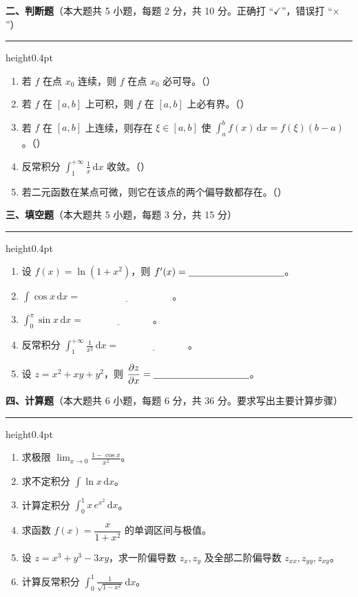 \documentclass[12pt]{ctexart}
\newcommand{\bigsection}[2]{%
  \vspace{6pt}%
  {\noindent\bfseries\large #1}\hfill{\normalsize（本大题共 #2）}\par
  \vspace{2pt}\hrule height0.4pt\vspace{8pt}}
\newcommand{\blank}[1][3cm]{\underline{\hspace{#1}}}
\begin{document}
\bigsection{二、判断题}{5 小题，每题 2 分，共 10 分。正确打 “$\checkmark$”，错误打 “$\times$”}

\begin{enumerate}[label=\arabic*.]
\item 若 $f$ 在点 $x_{0}$ 连续，则 $f$ 在点 $x_{0}$ 必可导。\hfill（\qquad）
\item 若 $f$ 在 $[a,b]$ 上可积，则 $f$ 在 $[a,b]$ 上必有界。\hfill（\qquad）
\item 若 $f$ 在 $[a,b]$ 上连续，则存在 $\xi\in[a,b]$ 使
  $\displaystyle\int_{a}^{b}f(x)\,\mathrm{d}x=f(\xi)(b-a)$。\hfill（\qquad）
\item 反常积分 $\displaystyle\int_{1}^{+\infty}\frac{1}{x}\,\mathrm{d}x$ 收敛。\hfill（\qquad）
\item 若二元函数在某点可微，则它在该点的两个偏导数都存在。\hfill（\qquad）
\end{enumerate}

\bigsection{三、填空题}{5 小题，每题 3 分，共 15 分}

\begin{enumerate}[label=\arabic*.]
\item 设 $f(x)=\ln(1+x^{2})$，则 $f'(x)=\blank[3.5cm]$。
\item $\displaystyle\int \cos x\,\mathrm{d}x=\blank[4cm]$。
\item $\displaystyle\int_{0}^{\pi}\sin x\,\mathrm{d}x=\blank[3cm]$。
\item 反常积分 $\displaystyle\int_{1}^{+\infty}\frac{1}{x^{2}}\,\mathrm{d}x=\blank[3cm]$。
\item 设 $z=x^{2}+xy+y^{2}$，则 $\dfrac{\partial z}{\partial x}=\blank[3.5cm]$。
\end{enumerate}

\bigsection{四、计算题}{6 小题，每题 6 分，共 36 分。要求写出主要计算步骤}

\begin{enumerate}[label=\arabic*.]
\item 求极限 $\displaystyle\lim_{x\to 0}\frac{1-\cos x}{x^{2}}$。

\item 求不定积分 $\displaystyle\int \ln x\,\mathrm{d}x$。

\item 计算定积分 $\displaystyle\int_{0}^{1} x\,e^{x^{2}}\,\mathrm{d}x$。

\item 求函数 $f(x)=\dfrac{x}{1+x^{2}}$ 的单调区间与极值。

\item 设 $z=x^{3}+y^{3}-3xy$，求一阶偏导数 $z_{x},z_{y}$ 及全部二阶偏导数
  $z_{xx},z_{yy},z_{xy}$。

\item 计算反常积分 $\displaystyle\int_{0}^{1}\frac{1}{\sqrt{1-x^{2}}}\,\mathrm{d}x$。
\end{enumerate}
\end{document}
